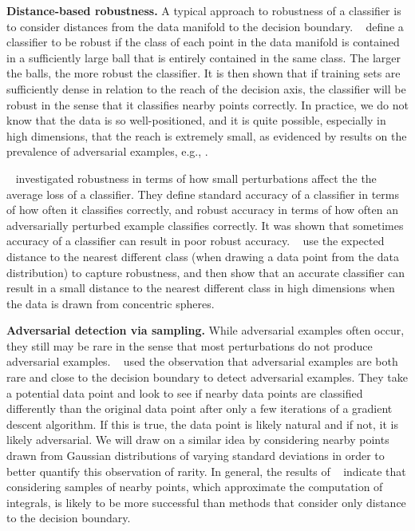 {\bf Distance-based robustness.}
A typical approach to robustness of a classifier is to consider distances from the data manifold to the decision boundary.  ~\cite{Khoury2018} define a classifier to be robust if the class of each point in the data manifold is contained in a sufficiently large ball that is entirely contained in the same class. The larger the balls, the more robust the classifier. It is then shown that if training sets are sufficiently dense in relation to the reach of the decision axis, the classifier will be robust in the sense that it classifies nearby points correctly. In practice, we do not know that the data is so well-positioned, and it is quite possible, especially in high dimensions, that the reach is extremely small, as evidenced by results on the prevalence of adversarial examples, e.g., \cite{shafahi2018are}.

~\cite{tsipras2018robustness} investigated robustness in terms of how small perturbations affect the the average loss of a classifier. They define standard accuracy of a classifier in terms of how often it classifies correctly, and robust accuracy in terms of how often an adversarially perturbed example classifies correctly. It was shown that sometimes accuracy of a classifier can result in poor robust accuracy. ~\cite{gilmer2018adversarial} use the expected distance to the nearest different class (when drawing a data point from the data distribution) to capture robustness, and then show that an accurate classifier can result in a small distance to the nearest different class in high dimensions when the data is drawn from concentric spheres. 

{\bf Adversarial detection via sampling.}
While adversarial examples often occur, they still may be rare in the sense that most perturbations do not produce adversarial examples. ~\cite{yu2019new} used the observation that adversarial examples are both rare and close to the decision boundary to detect adversarial examples. They take a potential data point and look to see if nearby data points are classified differently than the original data point after only a few iterations of a gradient descent algorithm. If this is true, the data point is likely natural and if not, it is likely adversarial. We will draw on a similar idea by considering nearby points drawn from Gaussian distributions of varying standard deviations in order to better quantify this observation of rarity. In general, the results of ~\cite{yu2019new} indicate that considering samples of nearby points, which approximate the computation of integrals, is likely to be more successful than methods that consider only distance to the decision boundary.

